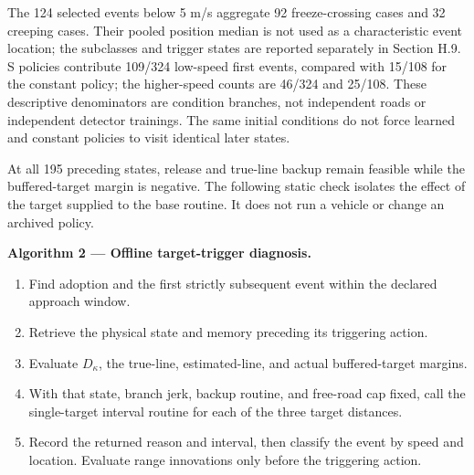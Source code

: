 \documentclass[letterpaper,journal,onecolumn]{IEEEtran}
\providecommand{\tightlist}{\setlength{\itemsep}{0pt}\setlength{\parskip}{0pt}}
\begin{document}
The 124 selected events below 5 m/s aggregate 92 freeze-crossing cases and 32 creeping cases. Their pooled position median is not used as a characteristic event location; the subclasses and trigger states are reported separately in Section H.9. S policies contribute 109/324 low-speed first events, compared with 15/108 for the constant policy; the higher-speed counts are 46/324 and 25/108. These descriptive denominators are condition branches, not independent roads or independent detector trainings. The same initial conditions do not force learned and constant policies to visit identical later states.

At all 195 preceding states, release and true-line backup remain feasible while the buffered-target margin is negative. The following static check isolates the effect of the target supplied to the base routine. It does not run a vehicle or change an archived policy.

\textbf{Algorithm 2 --- Offline target-trigger diagnosis.}

\begin{enumerate}
\def\labelenumi{\arabic{enumi}.}
\tightlist
\item
  Find adoption and the first strictly subsequent event within the declared approach window.
\item
  Retrieve the physical state and memory preceding its triggering action.
\item
  Evaluate \(D_\kappa\), the true-line, estimated-line, and actual buffered-target margins.
\item
  With that state, branch jerk, backup routine, and free-road cap fixed, call the single-target interval routine for each of the three target distances.
\item
  Record the returned reason and interval, then classify the event by speed and location. Evaluate range innovations only before the triggering action.
\end{enumerate}
\end{document}
